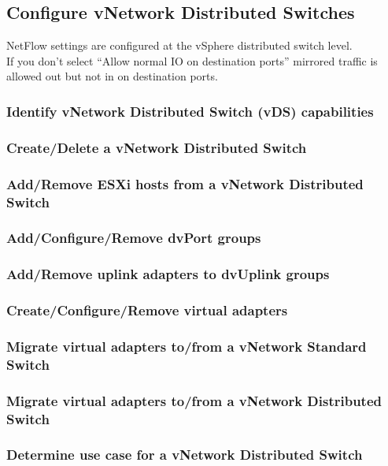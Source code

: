 \subsection{Configure vNetwork Distributed Switches}

NetFlow settings are configured at the vSphere distributed switch level.\\

If you don't select ``Allow normal IO on destination ports'' mirrored traffic
is allowed out but not in on destination ports.

\subsubsection{Identify vNetwork Distributed Switch (vDS) capabilities}

\subsubsection{Create/Delete a vNetwork Distributed Switch}

\subsubsection{Add/Remove ESXi hosts from a vNetwork Distributed Switch}

\subsubsection{Add/Configure/Remove dvPort groups}

\subsubsection{Add/Remove uplink adapters to dvUplink groups}

\subsubsection{Create/Configure/Remove virtual adapters}

\subsubsection{Migrate virtual adapters to/from a vNetwork Standard Switch}

\subsubsection{Migrate virtual adapters to/from a vNetwork Distributed Switch}

\subsubsection{Determine use case for a vNetwork Distributed Switch}
